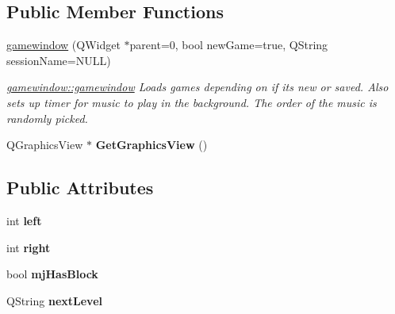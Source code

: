 \subsection*{Public Member Functions}
\begin{DoxyCompactItemize}
\item 
\hyperlink{classgamewindow_a3e131541b6a8c961d0156a62a02b7862}{gamewindow} (Q\-Widget $\ast$parent=0, bool new\-Game=true, Q\-String session\-Name=N\-U\-L\-L)
\begin{DoxyCompactList}\small\item\em \hyperlink{classgamewindow_a3e131541b6a8c961d0156a62a02b7862}{gamewindow\-::gamewindow} Loads games depending on if its new or saved. Also sets up timer for music to play in the background. The order of the music is randomly picked. \end{DoxyCompactList}\item 
\hypertarget{classgamewindow_ac1f14593e7296da6c62db78f159e48c8}{Q\-Graphics\-View $\ast$ {\bfseries Get\-Graphics\-View} ()}\label{classgamewindow_ac1f14593e7296da6c62db78f159e48c8}

\end{DoxyCompactItemize}
\subsection*{Public Attributes}
\begin{DoxyCompactItemize}
\item 
\hypertarget{classgamewindow_a958cf05885ec517bf2398c9fb2167a20}{int {\bfseries left}}\label{classgamewindow_a958cf05885ec517bf2398c9fb2167a20}

\item 
\hypertarget{classgamewindow_ada0baf8b25d537ad796b6b580201cbf1}{int {\bfseries right}}\label{classgamewindow_ada0baf8b25d537ad796b6b580201cbf1}

\item 
\hypertarget{classgamewindow_aa4b988159a5462c408238bf7ebcc847c}{bool {\bfseries mj\-Has\-Block}}\label{classgamewindow_aa4b988159a5462c408238bf7ebcc847c}

\item 
\hypertarget{classgamewindow_ab95f2fa0cc6ced06d9bb83e6ed1555f5}{Q\-String {\bfseries next\-Level}}\label{classgamewindow_ab95f2fa0cc6ced06d9bb83e6ed1555f5}

\end{DoxyCompactItemize}
